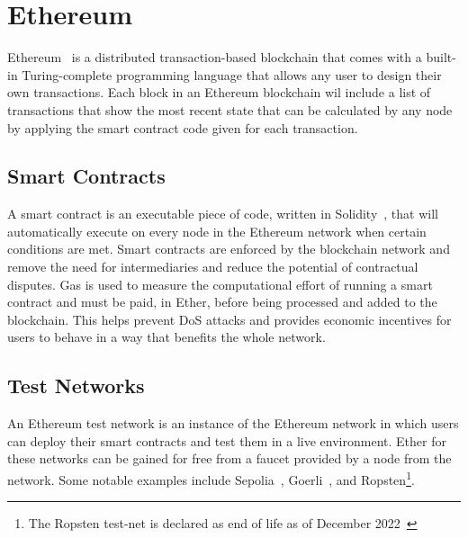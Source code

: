 
\section{Ethereum}

Ethereum~\cite{vujicic_blockchain_2018,dannen_introducing_2017} is a distributed transaction-based blockchain that comes with a built-in Turing-complete programming language that allows any user to design their own transactions. Each block in an Ethereum blockchain wil include a list of transactions that show the most recent state that can be calculated by any node by applying the smart contract code given for each transaction.

\subsection*{Smart Contracts}

A smart contract is an executable piece of code, written in Solidity~\cite{noauthor_solidity_nodate}, that will automatically execute on every node in the Ethereum network when certain conditions are met. Smart contracts are enforced by the blockchain network and remove the need for intermediaries and reduce the potential of contractual disputes.
\x
Gas is used to measure the computational effort of running a smart contract and must be paid, in Ether, before being processed and added to the blockchain. This helps prevent DoS attacks and provides economic incentives for users to behave in a way that benefits the whole network.

\subsection*{Test Networks}

An Ethereum test network is an instance of the Ethereum network in which users can deploy their smart contracts and test them in a live environment. Ether for these networks can be gained for free from a faucet provided by a node from the network. Some notable examples include Sepolia~\cite{noauthor_sepolia_nodate}, Goerli~\cite{noauthor_goerli_nodate}, and Ropsten\footnote{The Ropsten test-net is declared as end of life as of December 2022~\cite{noauthor_ropsten_2023}}.